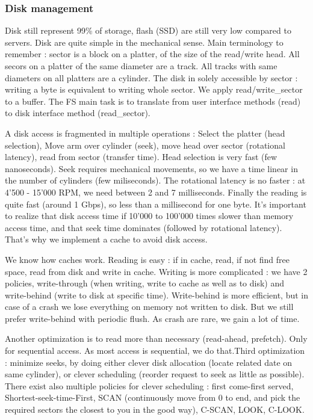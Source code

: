 \documentclass[12pt,a4paper]{article}
\begin{document}
\subsubsection{Disk management}
Disk still represent 99\% of storage, flash (SSD) are still very low compared to servers. Disk are quite simple in the mechanical sense. Main terminology to remember : sector is a block on a platter, of the size of the read/write head. All secors on a platter of the same diameter are a track. All tracks with same diameters on all platters are a cylinder. The disk in solely accessible by sector : writing a byte is equivalent to writing whole sector. We apply read/write\_sector to a buffer. The FS main task is to translate from user interface methods (read) to disk interface method (read\_sector). 

A disk access is fragmented in multiple operations : Select the platter (head selection), Move arm over cylinder (seek), move head over sector (rotational latency), read from sector (transfer time). Head selection is very fast (few nanoseconds). Seek requires mechanical movements, so we have a time linear in the number of cylinders (few miliseconds). The rotational latency is no faster : at 4'500 - 15'000 RPM, we need between 2 and 7 milliseconds. Finally the reading is quite fast (around 1 Gbps), so less than a millisecond for one byte. It's important to realize that disk access time if 10'000 to 100'000 times slower than memory access time, and that seek time dominates (followed by rotational latency). That's why we implement a cache to avoid disk access. 

We know how caches work. Reading is easy : if in cache, read, if not find free space, read from disk and write in cache. Writing is more complicated : we have 2 policies, write-through (when writing, write to cache as well as to disk) and write-behind (write to disk at specific time). Write-behind is more efficient, but in case of a crash we lose everything on memory not written to disk. But we still prefer write-behind with periodic flush. As crash are rare, we gain a lot of time. 

Another optimization is to read more than necessary (read-ahead, prefetch). Only for sequential access. As most access is sequential, we do that.Third optimization : minimize seeks, by doing either clever disk allocation (locate related date on same cylinder), or clever scheduling (reorder request to seek as little as possible). There exist also multiple policies for clever scheduling : first come-first served, Shortest-seek-time-First, SCAN (continuously move from 0 to end, and pick the required sectors the closest to you in the good way), C-SCAN, LOOK, C-LOOK.
\end{document}
